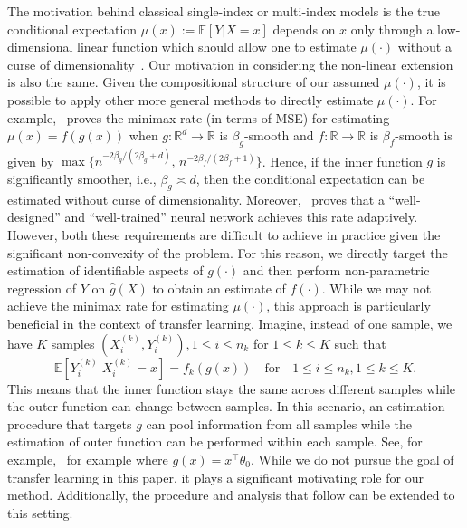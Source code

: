 \documentclass[11pt]{article}
\begin{document}
The motivation behind classical single-index or multi-index models is the true conditional expectation $\mu(x) := \mathbb{E}[Y|X = x]$ depends on $x$ only through a low-dimensional linear function which should allow one to estimate $\mu(\cdot)$ without a curse of dimensionality~\citep{gaiffas2007optimal}. Our motivation in considering the non-linear extension is also the same. Given the compositional structure of our assumed $\mu(\cdot)$, it is possible to apply other more general methods to directly estimate $\mu(\cdot)$. For example,~\cite{Schmidt_Hieber_2020} proves the minimax rate (in terms of MSE) for estimating $\mu(x) = f(g(x))$ when $g:\mathbb{R}^d\to\mathbb{R}$ is $\beta_g$-smooth and $f:\mathbb{R}\to\mathbb{R}$ is $\beta_f$-smooth is given by $\max\{n^{-2\beta_g/(2\beta_g + d)},\, n^{-2\beta_f/(2\beta_f + 1)}\}$. Hence, if the inner function $g$ is significantly smoother, i.e., $\beta_g \asymp d$, then the conditional expectation can be estimated without curse of dimensionality. Moreover,~\cite{Schmidt_Hieber_2020} proves that a ``well-designed'' and ``well-trained'' neural network achieves this rate adaptively. However, both these requirements are difficult to achieve in practice given the significant non-convexity of the problem. For this reason, we directly target the estimation of identifiable aspects of $g(\cdot)$ and then perform non-parametric regression of $Y$ on $\widehat{g}(X)$ to obtain an estimate of $f(\cdot)$. While we may not achieve the minimax rate for estimating $\mu(\cdot)$, this approach is particularly beneficial in the context of transfer learning. Imagine, instead of one sample, we have $K$ samples $(X_{i}^{(k)}, Y_{i}^{(k)}), 1\le i\le n_k$ for $1\le k\le K$ such that
\[
\mathbb{E}[Y_i^{(k)}|X_{i}^{(k)} = x] = f_k(g(x))\quad\mbox{for}\quad 1\le i\le n_k, 1\le k\le K. 
\]
This means that the inner function stays the same across different samples while the outer function can change between samples. In this scenario, an estimation procedure that targets $g$ can pool information from all samples while the estimation of outer function can be performed within each sample. See, for example,~\cite{chen2013estimation} for example where $g(x) = x^{\top}\theta_0$. While we do not pursue the goal of transfer learning in this paper, it plays a significant motivating role for our method. Additionally, the procedure and analysis that follow can be extended to this setting. 
\end{document}
